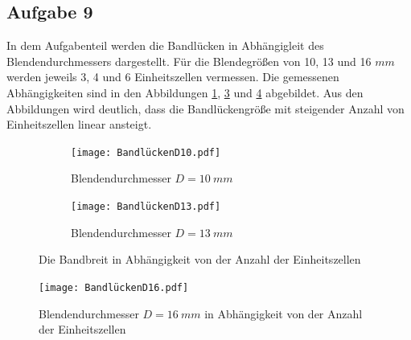 \subsection{Aufgabe 9}
In dem Aufgabenteil werden die Bandlücken in Abhängigleit des Blendendurchmessers dargestellt.
Für die Blendegrößen von 10, 13 und 16 $\si{mm}$ werden jeweils 3, 4 und 6 Einheitszellen vermessen.
Die gemessenen Abhängigkeiten sind in den Abbildungen \ref{fig.Aufgabe9}, \ref{fig.Aufgabe91} und \ref{fig.Aufgabe92} abgebildet.
Aus den Abbildungen wird deutlich, dass die Bandlückengröße mit steigender Anzahl von Einheitszellen linear ansteigt.
  \begin{figure}
   \centering
   \begin{subfigure}{0.48\textwidth}
    \centering
    \texttt{[image: BandlückenD10.pdf]}
    \caption{Blendendurchmesser $D=\SI{10}{mm}$}
    \label{fig.Aufgabe9}
   \end{subfigure}
   \begin{subfigure}{0.48\textwidth}
    \centering
    \texttt{[image: BandlückenD13.pdf]}
    \caption{Blendendurchmesser $D=\SI{13}{mm}$}
    \label{fig.Aufgabe91}
   \end{subfigure}
   \caption{Die Bandbreit in Abhängigkeit von der Anzahl der Einheitszellen}
  \end{figure}
  \begin{figure}[h!]
    \centering
    \texttt{[image: BandlückenD16.pdf]}
    \caption{Blendendurchmesser $D=\SI{16}{mm}$ in Abhängigkeit von der Anzahl der Einheitszellen}
    \label{fig.Aufgabe92}
  \end{figure}
  \FloatBarrier


